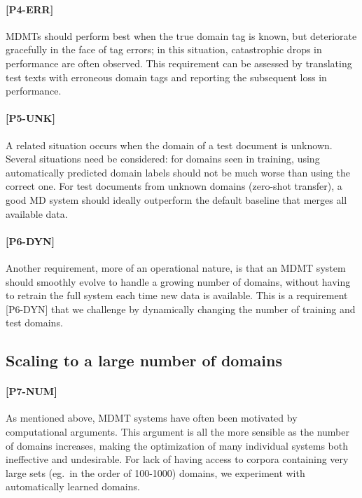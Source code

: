 \paragraph{[P4-ERR]}
MDMTs should perform best when the true domain tag is known, but deteriorate gracefully in the face of tag errors; in this situation, catastrophic drops in performance are often observed. This requirement can be assessed by translating test texts with erroneous domain tags and reporting the subsequent loss in performance.

\paragraph{[P5-UNK]}
A related situation occurs when the domain of a test document is unknown. Several situations need be considered: for domains seen in training, using automatically predicted domain labels should not be much worse than using the correct one. For test documents from unknown domains (zero-shot transfer), a good MD system should ideally outperform the default baseline that merges all available data.

\paragraph{[P6-DYN]}
Another requirement, more of an operational nature, is that an MDMT system should smoothly evolve to handle a growing number of domains, without having to retrain the full system each time new data is available. This is a requirement [P6-DYN] that we challenge by dynamically changing the number of training and test domains.

\subsection{Scaling to a large number of domains \label{ssec:scaling}}

\paragraph{[P7-NUM]} As mentioned above, MDMT systems have often been motivated by computational arguments. This argument is all the more sensible as the number of domains increases, making the optimization of many individual systems both ineffective and undesirable. For lack of having access to corpora containing very large sets (eg.\ in the order of 100-1000) domains, we experiment with automatically learned domains.

